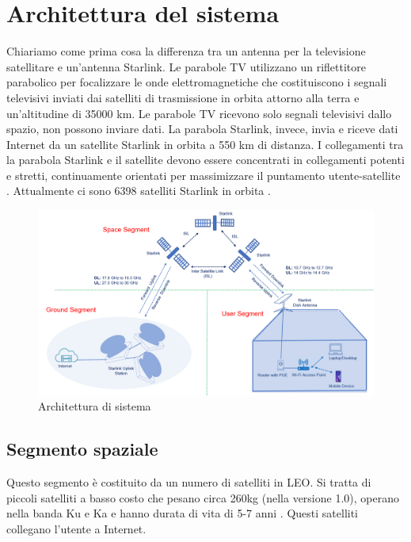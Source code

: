 
\chapter{Architettura del sistema}

Chiariamo come prima cosa la differenza tra un antenna per la televisione satellitare e un'antenna Starlink.
Le parabole TV utilizzano un riflettitore parabolico per focalizzare le onde elettromagnetiche che costituiscono i segnali televisivi inviati dai satelliti di trasmissione in orbita attorno alla terra e un'altitudine di 35000 km.
Le parabole TV ricevono solo segnali televisivi dallo spazio, non possono inviare dati.
La parabola Starlink, invece, invia e riceve dati Internet da un satellite Starlink in orbita a 550 km di distanza.
I collegamenti tra la parabola Starlink e il satellite devono essere concentrati in collegamenti potenti e stretti, continuamente orientati per massimizzare il puntamento utente-satellite \cite{branch_education_how_2022}.
Attualmente ci sono 6398 satelliti Starlink in orbita \cite{jonathan_mcdowell_starlink_nodate}.

\begin{figure}[htbp]
  \centering
  \includegraphics[width=0.9\linewidth]{./res/img/starlink-system-architecture.png}
  \caption{Architettura di sistema \cite{techplayon_spacex_2024}}
  \label{fig:starlink-system-architecture}
\end{figure}

\section{Segmento spaziale}
Questo segmento è costituito da un numero di satelliti in \ac{LEO}. Si tratta di piccoli satelliti a basso costo che pesano circa 260kg (nella versione 1.0), operano nella banda \ac{Ku} e \ac{Ka} e hanno durata di vita di 5-7 anni \cite{techplayon_spacex_2024}. Questi satelliti collegano l'utente a Internet.

